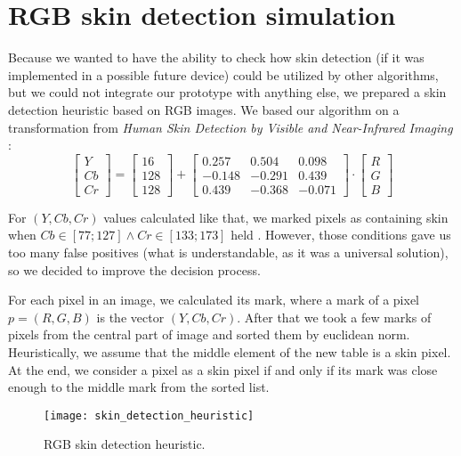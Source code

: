     \section{RGB skin detection simulation}
        Because we wanted to have the ability to check how skin detection
        (if it was implemented in a possible future device) could be utilized
        by other algorithms, but we could not integrate our prototype with
        anything else, we prepared a skin detection heuristic based on RGB images.
        We based our algorithm on a transformation from
        \textit{Human Skin Detection by Visible and Near-Infrared Imaging} \cite{toyotaskin}:
        \[
            \begin{bmatrix}
                Y \\
                Cb \\
                Cr
            \end{bmatrix}
            =
            \begin{bmatrix}
                16\\
                128\\
                128
            \end{bmatrix}
            +
             \begin{bmatrix}
                 0.257  &  0.504        &  0.098 \\
                -0.148  & -0.291        &  0.439 \\
                 0.439  & -0.368        & -0.071
            \end{bmatrix}
            \cdot
             \begin{bmatrix}
                R\\
                G\\
                B
            \end{bmatrix}
        \]

        For $(Y,Cb,Cr)$ values calculated like that, we marked pixels as containing
        skin when $Cb \in [77;127] \land Cr \in [133;173]$ held \cite{toyotaskin}.
        However, those conditions gave us too many false positives
        (what is understandable, as it was a universal solution),
        so we decided to improve the decision process.

        For each pixel in an image, we calculated its mark, where a mark of a pixel
        $p = (R, G, B)$ is the vector $(Y, Cb, Cr)$.
        After that we took a few marks of pixels from the central part of image and
        sorted them by euclidean norm.
        Heuristically, we assume that the middle element of the new table
        is a skin pixel.
        At the end, we consider a pixel as a skin pixel if and only if
        its mark was close enough to the middle mark from the sorted list.

        \begin{figure}[H]
            \caption{RGB skin detection heuristic.}
            \centering
            \texttt{[image: skin\_detection\_heuristic]}
            \label{fig:skin_detection_heuristic}
        \end{figure}
